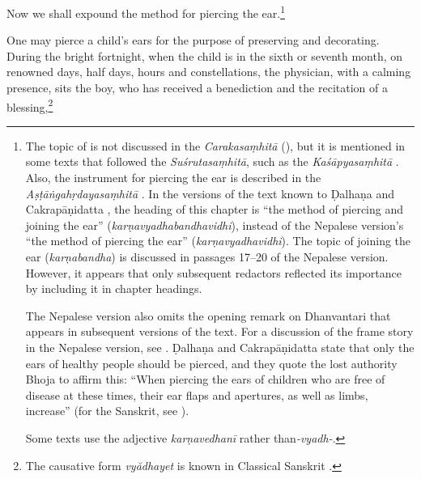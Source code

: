 \begin{translation}    
  
\item [1] 

Now we shall expound the method for piercing the ear.\footnote{The topic of 
     is not discussed in the \emph{Carakasaṃhitā}
    (\cite[IB, 326, n.\,175]{meul-hist}), but it is mentioned in some texts that
    followed the \emph{Suśrutasaṃhitā}, such as the \emph{Kaśāpyasaṃhitā} \citep[IIA,
    30]{meul-hist}. Also, the instrument for piercing the ear is described in the
    \emph{Aṣṭāṅgahṛdayasaṃhitā} . In the versions of the text known
    to Ḍalhaṇa \citep[76]{vulgate} and Cakrapāṇidatta \citep[125]{acar-1939}, the
    heading of this chapter is “the method of piercing and joining the ear”
    (\emph{karṇavyadhabandhavidhi}), instead of the Nepalese version's “the method of
    piercing the ear” (\emph{karṇavyadhavidhi}). The topic of joining the ear
    (\emph{karṇabandha}) is discussed in passages 17--20 of the Nepalese version.
    However, it appears that only subsequent redactors reflected its importance by
    including it in chapter headings.

 The Nepalese version also omits the opening remark on Dhanvantari that appears in
subsequent versions of the text. For a discussion of the frame story in the
Nepalese version, see \cite{birc-2021}. Ḍalhaṇa \citep[76]{vulgate} and
Cakrapāṇidatta \citep[125]{acar-1939} state that only the ears of healthy people
should be pierced, and they quote the lost authority Bhoja to affirm this: “When
piercing the ears of children who are free of disease at these times, their ear
flaps and apertures, as well as limbs, increase” (for the Sanskrit, see
\cite[76]{vulgate}).

Some texts use the adjective \emph{karṇavedhanī} rather than\emph{-vyadh-}.}

\item [2] 

One may pierce a child's ears for the purpose of preserving and decorating. During the
bright fortnight, when the child is in the sixth or seventh month, on renowned
days, half days, hours and constellations, the physician, with a calming presence,
sits the boy, who has received a benediction and the recitation of a
blessing,\footnote{The causative form \emph{vy\u adhayet} is known in Classical
    Sanskrit \citep[166]{whit-root}.

}
\end{translation}
